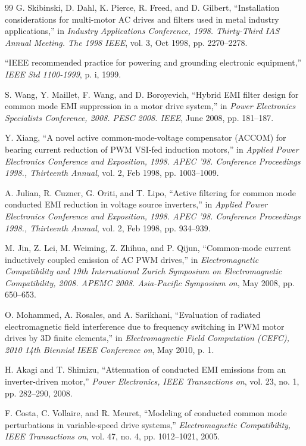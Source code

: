 \begin{thebibliography}{99}
G. Skibinski, D. Dahl, K. Pierce, R. Freed, and D. Gilbert, ``Installation considerations for multi-motor AC drives and filters used in metal industry applications,'' in \textit{Industry Applications Conference, 1998. Thirty-Third IAS Annual Meeting. The 1998 IEEE}, vol. 3, Oct 1998, pp. 2270--2278.

``IEEE recommended practice for powering and grounding electronic equipment,'' \textit{IEEE Std 1100-1999}, p. i, 1999.

S. Wang, Y. Maillet, F. Wang, and D. Boroyevich, ``Hybrid EMI filter design for common mode EMI suppression in a motor drive system,'' in \textit{Power Electronics Specialists Conference, 2008. PESC 2008. IEEE}, June 2008, pp. 181--187.

Y. Xiang, ``A novel active common-mode-voltage compensator (ACCOM) for bearing current reduction of PWM VSI-fed induction motors,'' in \textit{Applied Power Electronics Conference and Exposition, 1998. APEC '98. Conference Proceedings 1998., Thirteenth Annual}, vol. 2, Feb 1998, pp. 1003--1009.

A. Julian, R. Cuzner, G. Oriti, and T. Lipo, ``Active filtering for common mode conducted EMI reduction in voltage source inverters,'' in \textit{Applied Power Electronics Conference and Exposition, 1998. APEC '98. Conference Proceedings 1998., Thirteenth Annual}, vol. 2, Feb 1998, pp. 934--939.

M. Jin, Z. Lei, M. Weiming, Z. Zhihua, and P. Qijun, ``Common-mode current inductively coupled emission of AC PWM drives,'' in \textit{Electromagnetic Compatibility and 19th International Zurich Symposium on Electromagnetic Compatibility, 2008. APEMC 2008. Asia-Pacific Symposium on}, May 2008, pp. 650--653.

O. Mohammed, A. Rosales, and A. Sarikhani, ``Evaluation of radiated electromagnetic field interference due to frequency switching in PWM motor drives by 3D finite elements,'' in \textit{Electromagnetic Field Computation (CEFC), 2010 14th Biennial IEEE Conference on}, May 2010, p. 1.

H. Akagi and T. Shimizu, ``Attenuation of conducted EMI emissions from an inverter-driven motor,'' \textit{Power Electronics, IEEE Transactions on}, vol. 23, no. 1, pp. 282--290, 2008.

F. Costa, C. Vollaire, and R. Meuret, ``Modeling of conducted common mode perturbations in variable-speed drive systems,'' \textit{Electromagnetic Compatibility, IEEE Transactions on}, vol. 47, no. 4, pp. 1012--1021, 2005.


\end{thebibliography}
